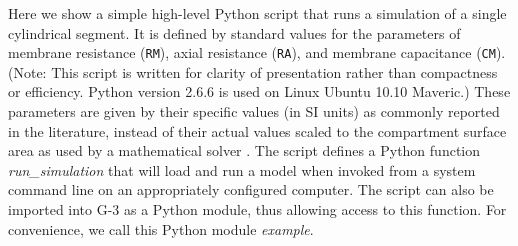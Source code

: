 \documentclass[12pt]{article}
\begin{document}
Here we show a simple high-level Python script that runs a simulation of a single cylindrical segment. It
is defined by standard values for the parameters of membrane
resistance ({\tt RM}), axial resistance ({\tt RA}), and membrane
capacitance ({\tt CM}). (Note: This script
  is written for clarity of presentation rather than compactness or
  efficiency. Python version 2.6.6 is used on Linux Ubuntu 10.10
  Maveric.)
These parameters are given by their specific values (in SI units) as
commonly reported in the literature, instead of their actual values
scaled to the compartment surface area as used by a mathematical
solver \cite{cornelis04:_neuros_param_handl}. The script defines a
Python function {\it run\_simulation} that will load and run a model when invoked from
a system command line on an appropriately configured computer.  The script
can also be imported into G-3 as a Python module, thus allowing access
to this function.  For convenience, we call this Python module {\it
  example}.
\end{document}
